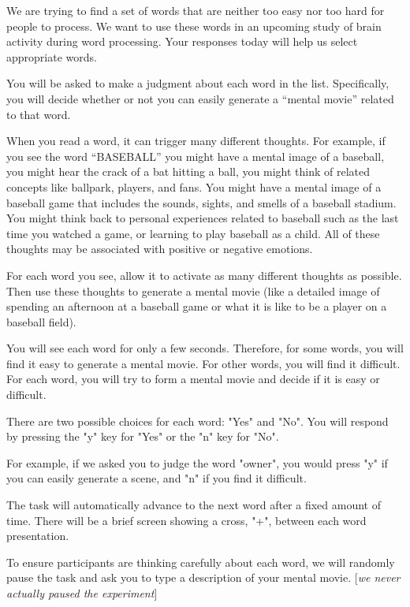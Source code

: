 \documentclass[12pt]{article}
\begin{document}
\begin{displayquote}

We are trying to find a set of words that are neither too easy nor too hard for people to process. We want to use these words in an upcoming study of brain activity during word processing. Your responses today will help us select appropriate words.

You will be asked to make a judgment about each word in the list. Specifically, you will decide whether or not you can easily generate a ``mental movie'' related to that word.

When you read a word, it can trigger many different thoughts. For example, if you see the word ``BASEBALL'' you might have a mental image of a baseball, you might hear the crack of a bat hitting a ball, you might think of related concepts like ballpark, players, and fans. You might have a mental image of a baseball game that includes the sounds, sights, and smells of a baseball stadium. You might think back to personal experiences related to baseball such as the last time you watched a game, or learning to play baseball as a child. All of these thoughts may be associated with positive or negative emotions.

For each word you see, allow it to activate as many different thoughts as possible. Then use these thoughts to generate a mental movie (like a detailed image of spending an afternoon at a baseball game or what it is like to be a player on a baseball field). 

You will see each word for only a few seconds. Therefore, for some words, you will find it easy to generate a mental movie. For other words, you will find it difficult. For each word, you will try to form a mental movie and decide if it is easy or difficult. 

There are two possible choices for each word: "Yes" and "No". You will respond by pressing the "y" key for "Yes" or the "n" key for "No".

For example, if we asked you to judge the word "owner", you would press "y" if you can easily generate a scene, and "n" if you find it difficult.

The task will automatically advance to the next word after a fixed amount of time. There will be a brief screen showing a cross, "+", between each word presentation.

To ensure participants are thinking carefully about each word, we will randomly pause the task and ask you to type a description of your mental movie. [\emph{we never actually paused the experiment}]

\end{displayquote}
\end{document}
